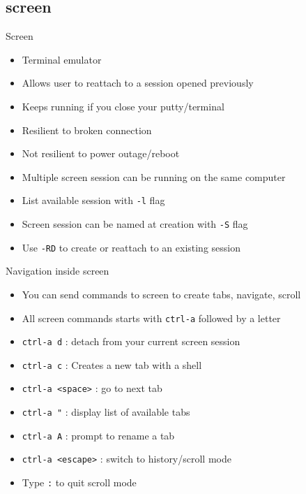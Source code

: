 \subsection{screen}

\begin{frame}{Screen}
\begin{itemize}
\pause \item Terminal emulator
\pause \item Allows user to reattach to a session opened previously
\pause \item Keeps running if you close your putty/terminal
\pause \item Resilient to broken connection
\pause \item Not resilient to power outage/reboot
\pause \item Multiple screen session can be running on the same computer
\pause \item List available session with \texttt{-l} flag
\pause \item Screen session can be named at creation with \texttt{-S} flag
\pause \item Use \texttt{-RD} to create or reattach to an existing session
\end{itemize}
\end{frame}

\begin{frame}{Navigation inside screen}
\begin{itemize}
  \pause \item You can send commands to screen to create tabs, navigate, scroll
  \pause \item All screen commands starts with \texttt{ctrl-a} followed by a letter
  \pause \item \texttt{ctrl-a d} : detach from your current screen session
  \pause \item \texttt{ctrl-a c} : Creates a new tab with a shell
  \pause \item \texttt{ctrl-a <space>} : go to next tab
  \pause \item \texttt{ctrl-a "} : display list of available tabs
  \pause \item \texttt{ctrl-a A} : prompt to rename a tab
  \pause \item \texttt{ctrl-a <escape>} : switch to history/scroll mode
  \pause \item Type \texttt{:} to quit scroll mode
\end{itemize}
\end{frame}

